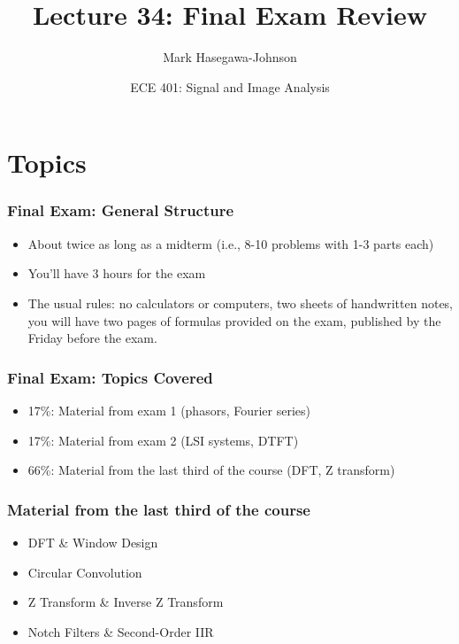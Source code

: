 \documentclass{beamer}
\title{Lecture 34: Final Exam Review}
\author{Mark Hasegawa-Johnson}
\date{ECE 401: Signal and Image Analysis}
\begin{document}
\begin{frame}
  \maketitle
\end{frame}

\begin{frame}
  \tableofcontents
\end{frame}


\section{Topics}
\setcounter{subsection}{1}

\begin{frame}
  \frametitle{Final Exam: General Structure}

  \begin{itemize}
  \item About twice as long as a midterm (i.e., 8-10 problems with 1-3 parts each)
  \item You'll have 3 hours for the exam
  \item The usual rules: no calculators or computers, two sheets of
    handwritten notes, you will have two pages of formulas provided on
    the exam, published by the Friday before the exam.  
  \end{itemize}
\end{frame}

\begin{frame}
  \frametitle{Final Exam: Topics Covered}

  \begin{itemize}
  \item 17\%: Material from exam 1 (phasors, Fourier series)
  \item 17\%: Material from exam 2 (LSI systems, DTFT)
  \item 66\%: Material from the last third of the course (DFT, Z transform)
  \end{itemize}
\end{frame}

\begin{frame}
  \frametitle{Material from the last third of the course}

  \begin{itemize}
  \item DFT \& Window Design
  \item Circular Convolution
  \item Z Transform \& Inverse Z Transform
  \item Notch Filters \& Second-Order IIR
  \end{itemize}
\end{frame}
\end{document}
